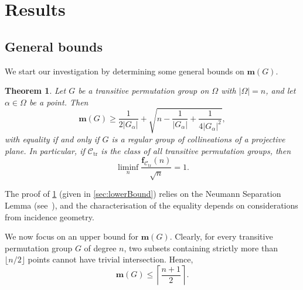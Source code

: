 \documentclass[a4paper]{amsart}
\newcommand{\Sym}{\mathrm{Sym}}
\newcommand{\f}{\mathbf{f}}
\newcommand{\m}{\mathbf{m}}
\newtheorem{thmx}{Theorem}[]
\theoremstyle{definition}
\newtheorem{example}[theorem]{Example}
\begin{document}
\section{Results}
\subsection{General bounds}
We start our investigation by determining some general bounds on $\m(G)$.

\begin{thmx}\label{thm:neumann}
    Let $G$ be a transitive permutation group on $\Omega$ with $|\Omega|=n$, and let $\alpha \in \Omega$ be a point. Then
    \begin{equation}\label{eq:lowerBound}
    \m(G) \ge \frac{1}{2|G_\alpha|} + \sqrt{n - \frac{1}{|G_\alpha|} + \frac{1}{4|G_\alpha|^2}},
    \end{equation}
    with equality if and only if $G$ is a regular group of collineations
    of a projective plane. In particular, if $\mathcal{C_{\mathrm{tr}}}$ is the class of all transitive permutation groups, then
    \[ \liminf_n \frac{\f_\mathcal{C_{\mathrm{tr}}}(n)}{\sqrt{n}} = 1 .\]
\end{thmx}
The proof of \cref{thm:neumann} (given in \cref{sec:lowerBound}) relies on the Neumann Separation Lemma (see~\cite{ BirchBurnsMacdonaldNeumann1976, Neumann1975}), and the characterisation of the equality depends on considerations from incidence geometry.







We now focus on an upper bound for $\m(G)$. Clearly, for every transitive permutation group $G$ of degree $n$, two subsets containing strictly more than $\lfloor  n / 2 \rfloor$ points cannot have trivial intersection. Hence,
\begin{equation}\label{eq:upperBound}
    \m(G) \le \left\lceil \frac{n + 1}{2} \right\rceil.
\end{equation} 

\end{document}
